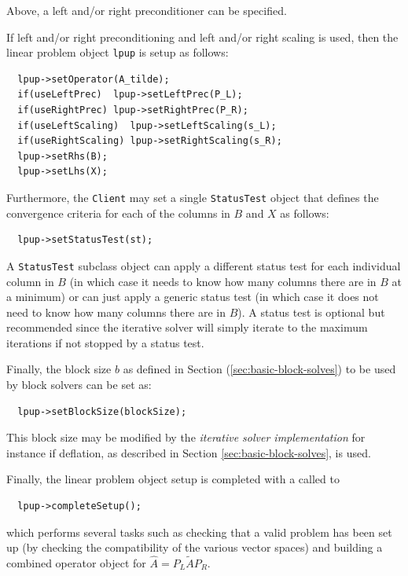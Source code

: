\documentclass[pdf,ps2pdf,11pt]{SANDreport}
\begin{document}
\begin{enumerate}
Above, a left and/or right preconditioner can be specified.

If left and/or right preconditioning and left and/or right scaling is
used, then the linear problem object {}\texttt{lpup} is setup as
follows:

{\scriptsize\begin{verbatim}
  lpup->setOperator(A_tilde);
  if(useLeftPrec)  lpup->setLeftPrec(P_L);
  if(useRightPrec) lpup->setRightPrec(P_R);
  if(useLeftScaling)  lpup->setLeftScaling(s_L);
  if(useRightScaling) lpup->setRightScaling(s_R);
  lpup->setRhs(B);
  lpup->setLhs(X);
\end{verbatim}}

Furthermore, the {}\texttt{Client} may set a single
{}\texttt{Status\-Test} object that defines the convergence criteria
for each of the columns in $B$ and $X$ as follows:

{\scriptsize\begin{verbatim}
  lpup->setStatusTest(st);
\end{verbatim}}

A {}\texttt{Status\-Test} subclass object can apply a different status
test for each individual column in $B$ (in which case it needs to know
how many columns there are in $B$ at a minimum) or can just apply a
generic status test (in which case it does not need to know how many
columns there are in $B$).  A status test is optional but recommended
since the iterative solver will simply iterate to the maximum
iterations if not stopped by a status test.

Finally, the block size $b$ as defined in Section
(\ref{sec:basic-block-solves}) to be used by block solvers can be set
as:

{\scriptsize\begin{verbatim}
  lpup->setBlockSize(blockSize);
\end{verbatim}}

This block size may be modified by the {}\textit{iterative solver
implementation} for instance if deflation, as described in Section
{}\ref{sec:basic-block-solves}, is used.

Finally, the linear problem object setup is completed with a called to

{\scriptsize\begin{verbatim}
  lpup->completeSetup();
\end{verbatim}}

which performs several tasks such as checking that a valid problem has
been set up (by checking the compatibility of the various vector
spaces) and building a combined operator object for $\hat{A} = P_L
\tilde{A} P_R$.


\end{enumerate}
\end{document}
